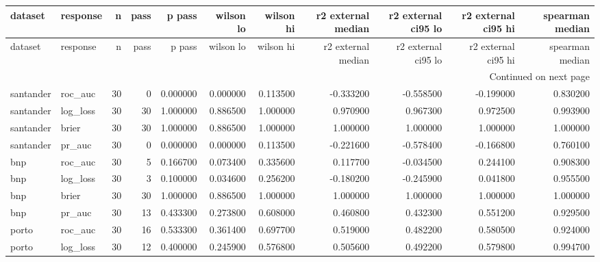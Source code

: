 \begin{center}\label{tab:s6gate}\end{center}
\begingroup\tiny\setlength{\tabcolsep}{2.5pt}
\begin{longtable}{llrrrrrrrrr}
\toprule
dataset & response & n & pass & p pass & wilson lo & wilson hi & r2 external median & r2 external ci95 lo & r2 external ci95 hi & spearman median \\
\midrule
\endfirsthead
\toprule
dataset & response & n & pass & p pass & wilson lo & wilson hi & r2 external median & r2 external ci95 lo & r2 external ci95 hi & spearman median \\
\midrule
\endhead
\midrule
\multicolumn{11}{r}{Continued on next page} \\
\midrule
\endfoot
\bottomrule
\endlastfoot
santander & roc\_auc & 30 & 0 & 0.000000 & 0.000000 & 0.113500 & -0.333200 & -0.558500 & -0.199000 & 0.830200 \\
santander & log\_loss & 30 & 30 & 1.000000 & 0.886500 & 1.000000 & 0.970900 & 0.967300 & 0.972500 & 0.993900 \\
santander & brier & 30 & 30 & 1.000000 & 0.886500 & 1.000000 & 1.000000 & 1.000000 & 1.000000 & 1.000000 \\
santander & pr\_auc & 30 & 0 & 0.000000 & 0.000000 & 0.113500 & -0.221600 & -0.578400 & -0.166800 & 0.760100 \\
bnp & roc\_auc & 30 & 5 & 0.166700 & 0.073400 & 0.335600 & 0.117700 & -0.034500 & 0.244100 & 0.908300 \\
bnp & log\_loss & 30 & 3 & 0.100000 & 0.034600 & 0.256200 & -0.180200 & -0.245900 & 0.041800 & 0.955500 \\
bnp & brier & 30 & 30 & 1.000000 & 0.886500 & 1.000000 & 1.000000 & 1.000000 & 1.000000 & 1.000000 \\
bnp & pr\_auc & 30 & 13 & 0.433300 & 0.273800 & 0.608000 & 0.460800 & 0.432300 & 0.551200 & 0.929500 \\
porto & roc\_auc & 30 & 16 & 0.533300 & 0.361400 & 0.697700 & 0.519000 & 0.482200 & 0.580500 & 0.924000 \\
porto & log\_loss & 30 & 12 & 0.400000 & 0.245900 & 0.576800 & 0.505600 & 0.492200 & 0.579800 & 0.994700 \\

\end{longtable}
